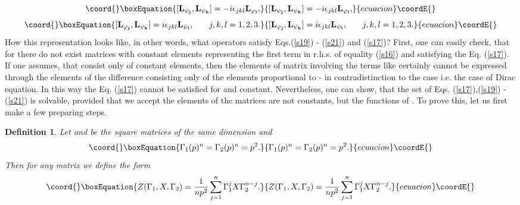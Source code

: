 \documentclass[a4paper,a4paper]{article}
\newtheorem{definition}[theorem]{Definition}
\begin{document}
\begin{equation}\coord{}\boxEquation{
\lbrack \mathbf{L_{\psi _{j}}},\mathbf{L_{\psi _{k}}}]=-i\epsilon _{jkl}
\mathbf{L_{\varphi _{l}},}  \label{s20}
}{
\lbrack \mathbf{L_{\psi _{j}}},\mathbf{L_{\psi _{k}}}]=-i\epsilon _{jkl}
\mathbf{L_{\varphi _{l}},}  }{ecuacion}\coordE{}\end{equation}%
\begin{equation}\coord{}\boxEquation{
\lbrack \mathbf{L_{\varphi _{j}}},\mathbf{L_{\psi _{k}}}]=i\epsilon _{jkl}
\mathbf{L_{\psi _{l}},\qquad }j,k,l=1,2,3.  \label{s21}
}{
\lbrack \mathbf{L_{\varphi _{j}}},\mathbf{L_{\psi _{k}}}]=i\epsilon _{jkl}
\mathbf{L_{\psi _{l}},\qquad }j,k,l=1,2,3.  }{ecuacion}\coordE{}\end{equation}%
How this representation looks like, in other words, what operators \coordHE{} satisfy Eqs.(\ref{s19}) - (\ref{s21}) and (\ref{s17})? First,
one can easily check, that for \coordHE{} there do not exist matrices \coordHE{} with constant elements representing the first term in r.h.s. of equality
(\ref{s16}) and satisfying the Eq. (\ref{s17}). If one assumes, that \coordHE{} consist only of constant elements, then the elements of matrix \coordHE{} involving the terms like \coordHE{}
certainly cannot be expressed through the elements of the difference \coordHE{} consisting only of the elements
proportional to \coordHE{} - in contradistinction to the case \coordHE{} i.e.
the case of Dirac equation. In this way the Eq. (\ref{s17}) cannot be
satisfied for \coordHE{} and \coordHE{} constant. Nevertheless, one can show,
that the set of Eqs. (\ref{s17}),(\ref{s19}) - (\ref{s21}) is solvable,
provided that we accept the elements of the matrices \coordHE{} are not
constants, but the functions of \coordHE{}. To prove this, let us first make a
few preparing steps.

\begin{definition}
Let \coordHE{} and \coordHE{} be the square matrices of the
same dimension and%
\begin{equation*}\coord{}\boxEquation{
\Gamma _{1}(p)^{n}=\Gamma _{2}(p)^{n}=p^{2}.
}{
\Gamma _{1}(p)^{n}=\Gamma _{2}(p)^{n}=p^{2}.
}{ecuacion}\coordE{}\end{equation*}
Then for any matrix \coordHE{} we define the form 
\begin{equation}\coord{}\boxEquation{
Z(\Gamma _{1},X,\Gamma _{2})=\frac{1}{np^{2}}\sum_{j=1}^{n}\Gamma
_{1}^{j}X\Gamma _{2}^{n-j}.  \label{s22}
}{
Z(\Gamma _{1},X,\Gamma _{2})=\frac{1}{np^{2}}\sum_{j=1}^{n}\Gamma
_{1}^{j}X\Gamma _{2}^{n-j}.  }{ecuacion}\coordE{}\end{equation}
\end{definition}
\end{document}
